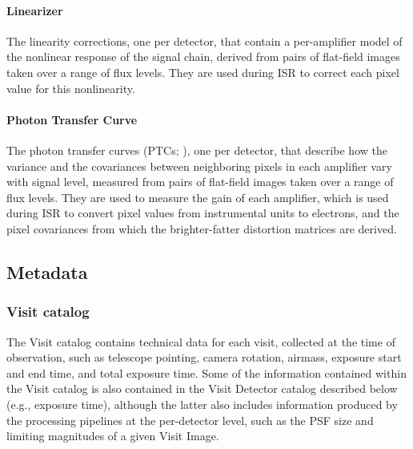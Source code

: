 \paragraph{Linearizer}
The linearity corrections, one per detector, that contain a per-amplifier model of the nonlinear response of the signal chain, derived from pairs of flat-field images taken over a range of flux levels.
They are used during \gls{ISR} to correct each pixel value for this nonlinearity.
\paragraph{Photon Transfer Curve}
The photon transfer curves (\glspl{PTC}; \citealt[][]{2019A&A...629A..36A}), one per detector, that describe how the variance and the covariances between neighboring pixels in each amplifier vary with signal level, measured from pairs of flat-field images taken over a range of flux levels.
They are used to measure the gain of each amplifier, which is used during \gls{ISR} to convert pixel values from instrumental units to electrons, and the pixel covariances from which the brighter-fatter distortion matrices are derived.



\subsection{Metadata}
\label{ssec:metadata}
\subsubsection{Visit catalog}
\label{sssec:visitcatalog}
The Visit catalog contains technical data for each visit, collected at the time of observation, such as telescope pointing, \gls{camera} rotation, airmass, exposure start and end time, and total exposure time.
Some of the information contained within the Visit catalog is also contained in the Visit Detector catalog described below (e.g., exposure time), although the latter also includes information produced by the processing pipelines at the per-detector level, such as the \gls{PSF} size and limiting magnitudes of a given Visit Image.

